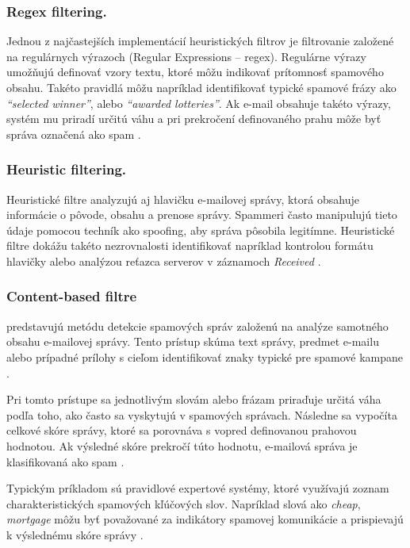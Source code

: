 \documentclass[conference]{IEEEtran}
\begin{document}
\subsubsection*{Regex filtering.}
Jednou z najčastejších implementácií heuristických filtrov je
filtrovanie založené na regulárnych výrazoch (Regular
Expressions – regex). Regulárne výrazy umožňujú definovať
vzory textu, ktoré môžu indikovať prítomnosť spamového
obsahu. Takéto pravidlá môžu napríklad identifikovať
typické spamové frázy ako \textit{“selected winner”},
 alebo \textit{“awarded lotteries”}.
Ak e-mail obsahuje takéto výrazy, systém mu priradí určitú
váhu a pri prekročení definovaného prahu môže byť správa
označená ako spam \cite{jakobsson2007phishing}.

\subsubsection*{Heuristic filtering.}
Heuristické filtre analyzujú aj hlavičku e-mailovej správy,
ktorá obsahuje informácie o pôvode, obsahu a prenose
správy. Spammeri často manipulujú tieto údaje pomocou
techník ako spoofing, aby správa pôsobila legitímne.
Heuristické filtre dokážu takéto nezrovnalosti identifikovať
napríklad kontrolou formátu hlavičky alebo analýzou
reťazca serverov v záznamoch \textit{Received}
\cite{jakobsson2007phishing,karim2019spam}.

\subsubsection*{Content-based filtre}

predstavujú metódu detekcie spamových
správ založenú na analýze samotného obsahu e-mailovej
správy. Tento prístup skúma text správy, predmet e-mailu
alebo prípadné prílohy s cieľom identifikovať znaky typické
pre spamové kampane \cite{karim2019spam}.

Pri tomto prístupe sa jednotlivým slovám alebo frázam
priraďuje určitá váha podľa toho, ako často sa vyskytujú
v spamových správach. Následne sa vypočíta celkové skóre
správy, ktoré sa porovnáva s vopred definovanou prahovou
hodnotou. Ak výsledné skóre prekročí túto hodnotu,
e-mailová správa je klasifikovaná ako spam
\cite{karim2019spam}.

Typickým príkladom sú pravidlové expertové systémy,
ktoré využívajú zoznam charakteristických spamových
kľúčových slov. Napríklad slová ako \textit{cheap},
\textit{mortgage}  môžu byť
považované za indikátory spamovej komunikácie a
prispievajú k výslednému skóre správy
\cite{karim2019spam}.
\end{document}
